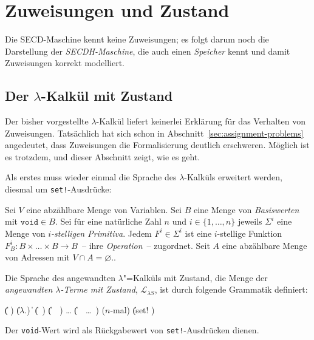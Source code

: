 \chapter{Zuweisungen und Zustand}

Die SECD-Maschine
kennt keine Zuweisungen; es folgt darum noch die Darstellung der
\textit{SECDH-Maschine}, die auch einen \textit{Speicher} kennt und
damit Zuweisungen korrekt modelliert.

\section{Der $\lambda$-Kalkül mit Zustand}

Der bisher vorgestellte $\lambda$-Kalkül liefert keinerlei Erklärung
für das Verhalten von Zuweisungen.  Tatsächlich hat sich schon in
Abschnitt~\ref{sec:assignment-problems} angedeutet, dass Zuweisungen
die Formalisierung deutlich erschweren.  Möglich ist es trotzdem, und
dieser Abschnitt zeigt, wie es geht.

Als erstes muss wieder einmal die Sprache des $\lambda$-Kalküls
erweitert werden, diesmal um \lstinline{set!}-Ausdrücke:
%
\begin{definition}
  Sei $V$ eine abzählbare Menge von Variablen.  Sei $B$ eine Menge von
  \textit{Basiswerten} mit $\mathtt{void} \in B$.
  Sei für eine natürliche Zahl $n$ und $i \in \{1, \ldots, n\}$
  jeweils $\Sigma^i$ eine Menge von \textit{$i$-stelligen
    Primitiva}.  Jedem $F^i\in\Sigma^i$ ist eine
  $i$-stellige Funktion $F_B^i: B\times\ldots\times B \rightarrow
  B$~-- ihre \textit{Operation}~-- zugordnet.
  Seit $A$ eine abzählbare Menge von Adressen mit $V\cap A =
  \varnothing$.. 

  Die Sprache des angewandten $\lambda$"=Kalküls mit Zustand, die
  Menge der \textit{angewandten $\lambda$-Terme mit Zustand},
  $\mathcal{L}_{\lambda{}S}$, ist
  durch folgende Grammatik definiert:
  \begin{grammar}
     \: 
    \> \| ( )
    \> \| ($\lambda$.)
    \> \| 
    \> \| (~)
    \> \| (~~)
    \> \ldots
    \> \| (~~\ldots~)  \quad \textrm{($n$-mal)}
    \> \| (set!  )
  \end{grammar}
\end{definition}
%
Der \lstinline{void}-Wert wird als Rückgabewert von
\lstinline{set!}-Ausdrücken dienen.

